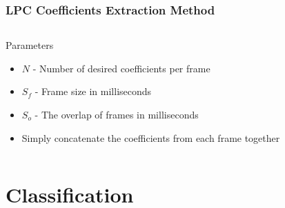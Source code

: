 \documentclass{beamer}
\begin{document}
\begin{frame}
\frametitle{LPC Coefficients Extraction Method}
\begin{columns}[c]
  \column{2in}
    \begin{block}{Parameters}
    \begin{itemize}
    	\item $N$ - Number of desired coefficients per frame
		\item $S_f$ - Frame size in milliseconds
		\item $S_o$ - The overlap of frames in milliseconds
		\item Simply concatenate the coefficients from each frame together
    \end{itemize}
    \end{block}
  \column{1.8in}
  	\\
\end{columns}
\end{frame}


\section{Classification}
\end{document}
